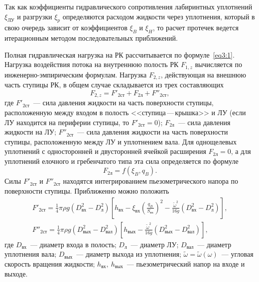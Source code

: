 Так как коэффициенты гидравлического сопротивления лабиринтных уплотнений $\xi_{\text{ЛУ}}$ и 
разгрузки $\xi_p$ определяются расходом жидкости через уплотнения,
который в свою очередь зависит от коэффициентов $\xi_B$ и $\xi_H$, то расчет протечек ведется 
итерационным методом последовательных приближений.

Полная гидравлическая нагрузка на РК рассчитывается по формуле~\eqref{eq3:1}. Нагрузка воздействия потока на 
внутреннюю полость РК $F_{1,z}$ вычисляется по инженерно-эмпирическим формулам.
Нагрузка $F_{2,z}$, действующая на внешнюю часть ступицы РК, в общем случае складывается из трех составляющих
\begin{equation*}
  F_{2,z} = F'_{2\text{ст}} + F_{2\text{л}} + F''_{2\text{ст}},
\end{equation*}
где $F'_{2\text{ст}}$~--- сила давления жидкости на часть поверхности ступицы, расположенную между 
входом в полость <<ступица\,---\,крышка>> и ЛУ
(если ЛУ находится на периферии ступицы, то $F'_{2\text{ст}}=0$); $F_{2\text{л}}$~--- сила давления 
жидкости на ЛУ; $F''_{2\text{ст}}$~--- сила давления жидкости на часть поверхности ступицы, 
расположенную между ЛУ и уплотнением вала.
Для однощелевых уплотнений с односторонней и двусторонней ячейкой расширения $F_{2\text{л}}=0$,
а для уплотнений елочного и гребенчатого типа эта сила определяется по формуле~\cite{mak_pilev}
\begin{equation*}
  F_{2\text{л}} = f(\xi_B ,q_B ).
\end{equation*}
Силы $F'_{2\text{ст}}$ и $F''_{2\text{ст}}$ находятся интегрированием пьезометрического напора по 
поверхности ступицы. Приближенно можно положить
\begin{gather*}
 F'_{2\text{ст}}=\frac{1}{4}\pi\rho g\left( {D_{\text{вх}}^2 - D_{\text{л}}^2}\right)\left[{h_{\text{вх}} 
      -\xi_{\text{вх}}
       \left({\frac{{q_B}}{{S_{\text{вх}} }}} \right)^2  - \frac{\tilde{\omega}^2}{16g}
       \left( {D_{\text{вх}}^2  - D_{\text{л}}^2 } \right)} \right], \\
 F''_{2\text{ст}} = \frac{1}{4}\pi \rho g\left( {D_{\text{вых}}^2  - D_{\text{вал}}^2 } \right)
       \left[{h_{\text{вых}} - \frac{\tilde{\omega}^2}{16g}
       \left( {D_{\text{вых}}^2 - D_{\text{вал}}^2} \right)} \right],
\end{gather*}
где $D_{\text{вх}}$~--- диаметр входа в полость; $D_{\text{л}}$~--- диаметр ЛУ; $D_{\text{вал}}$~--- 
диаметр уплотнения вала;
$D_{\text{вых}}$~--- диаметр выхода из уплотнения;
$\tilde{\omega}=\tilde{\omega}(\omega)$~--- угловая скорость вращения 
жидкости; $h_{\text{вх}},~h_{\text{вых}}$~--- пьезометрический напор на входе и выходе.

